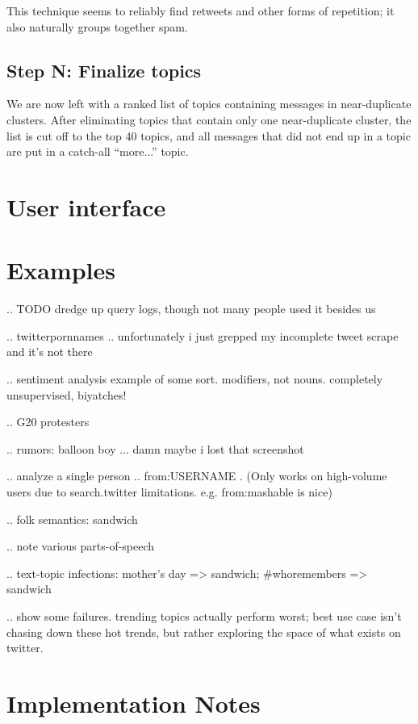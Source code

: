 \documentclass[letterpaper]{article}
\begin{document}
This technique seems to reliably find retweets and other forms of repetition; it also naturally groups together spam.


\subsection{Step N: Finalize topics}

We are now left with a ranked list of topics containing messages in near-duplicate clusters.  After eliminating topics that contain only one near-duplicate cluster, the list is cut off to the top 40 topics, and all messages that did not end up in a topic are put in a catch-all ``more...'' topic.

\section{User interface}

\section{Examples}

.. TODO dredge up query logs, though not many people used it besides us

.. twitterpornnames .. unfortunately i just grepped my incomplete tweet scrape and it's not there

.. sentiment analysis example of some sort.  modifiers, not nouns.  completely unsupervised, biyatches!

.. G20 protesters

.. rumors: balloon boy ... damn maybe i lost that screenshot

.. analyze a single person .. from:USERNAME .   (Only works on high-volume users due to search.twitter limitations.  e.g. from:mashable is nice)

.. folk semantics: sandwich

.. note various parts-of-speech

.. text-topic infections: mother's day => sandwich; \#whoremembers => sandwich

.. show some failures.  trending topics actually perform worst; best use case isn't chasing down these hot trends, but rather exploring the space of what exists on twitter.

\section{Implementation Notes}
\end{document}
